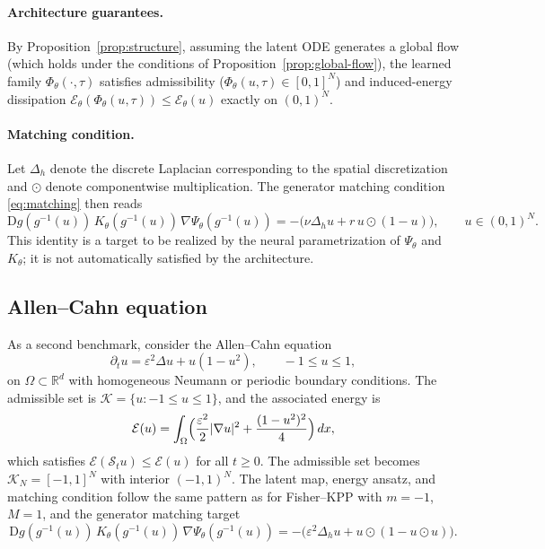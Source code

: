 \documentclass[hidelinks,review,nohypdvips,onefignum,onetabnum]{siamart220329}
\newcommand{\R}{\mathbb{R}}
\newcommand{\cS}{\mathcal{S}}
\newcommand{\cK}{\mathcal{K}}
\newcommand{\cE}{\mathcal{E}}
\newcommand{\PhiT}{\Phi_{\theta}}
\begin{document}
\paragraph{Architecture guarantees.}
By Proposition~\ref{prop:structure}, assuming the latent ODE generates a global flow (which holds under the conditions of Proposition~\ref{prop:global-flow}), the learned family $\PhiT(\cdot,\tau)$ satisfies admissibility ($\PhiT(u,\tau)\in[0,1]^N$) and induced-energy dissipation $\cE_{\theta}(\PhiT(u,\tau))\le\cE_{\theta}(u)$ exactly on $(0,1)^N$.

\paragraph{Matching condition.}
Let $\Delta_h$ denote the discrete Laplacian corresponding to the spatial discretization and $\odot$ denote componentwise multiplication. The generator matching condition \eqref{eq:matching} then reads
\begin{equation}\label{eq:matching-fisher}
\mathrm{D}g(g^{-1}(u))\,K_{\theta}(g^{-1}(u))\,\nabla\Psi_{\theta}(g^{-1}(u)) = -\bigl(\nu\Delta_h u + r\,u\odot(1-u)\bigr),\qquad u\in(0,1)^N.
\end{equation}
This identity is a target to be realized by the neural parametrization of $\Psi_{\theta}$ and $K_{\theta}$; it is not automatically satisfied by the architecture.

\subsection{Allen--Cahn equation}\label{subsec:allen-cahn}
As a second benchmark, consider the Allen--Cahn equation
\begin{equation}\label{eq:allen-cahn-bench}
\partial_t u = \varepsilon^2 \Delta u + u(1-u^2), \qquad -1\le u\le 1,
\end{equation}
on $\Omega\subset \R^d$ with homogeneous Neumann or periodic boundary conditions. The admissible set is $\cK=\{u:-1\le u\le 1\}$, and the associated energy is
\begin{equation}\label{eq:allen-cahn-energy}
\cE(u)=\int_\Omega\Bigl(\frac{\varepsilon^2}{2}|\nabla u|^2 + \frac{(1-u^2)^2}{4}\Bigr)\,dx,
\end{equation}
which satisfies $\cE(\cS_t u)\le \cE(u)$ for all $t\ge 0$. The admissible set becomes $\cK_N=[-1,1]^N$ with interior $(-1,1)^N$. The latent map, energy ansatz, and matching condition follow the same pattern as for Fisher--KPP with $m=-1$, $M=1$, and the generator matching target
\begin{equation}\label{eq:matching-allen-cahn}
\mathrm{D}g(g^{-1}(u))\,K_{\theta}(g^{-1}(u))\,\nabla\Psi_{\theta}(g^{-1}(u)) = -\bigl(\varepsilon^2\Delta_h u + u\odot(1-u\odot u)\bigr).
\end{equation}
\end{document}
